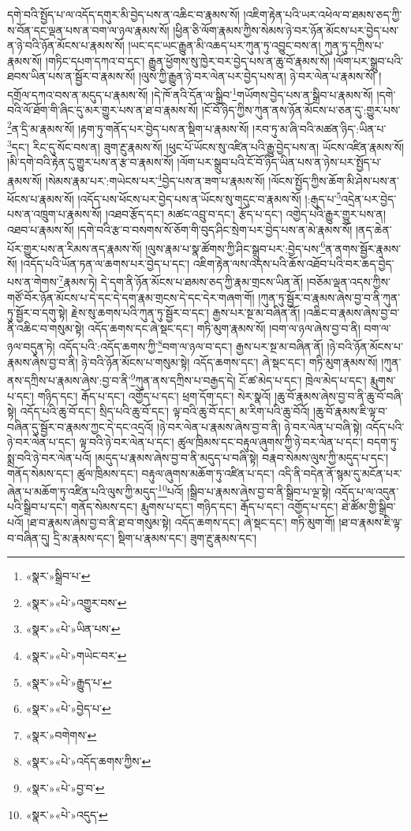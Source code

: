 དགེ་བའི་སྤྱོད་པ་ལ་འདོད་དགུར་མི་བྱེད་པས་ན་འཆིང་བ་རྣམས་སོ། །འཇིག་རྟེན་པའི་ཡར་འཕེལ་བ་ཐམས་ཅད་ཀྱི་ས་བོན་དང་ལྡན་པས་ན་བག་ལ་ཉལ་རྣམས་སོ། །ཕྱིན་ཅི་ལོག་རྣམས་ཀྱིས་སེམས་ཉེ་བར་ཉོན་མོངས་པར་བྱེད་པས་ན་ཉེ་བའི་ཉོན་མོངས་པ་རྣམས་སོ། །ཡང་དང་ཡང་རྒྱུན་མི་འཆད་པར་ཀུན་ཏུ་འབྱུང་བས་ན། ཀུན་ཏུ་དཀྲིས་པ་རྣམས་སོ། །གཏིང་དཔག་དཀའ་བ་དང་། རྒྱུན་ཕྱོགས་སུ་ཁྱེར་བར་བྱེད་པས་ན་ཆུ་བོ་རྣམས་སོ། །ལོག་པར་སྒྲུབ་པའི་ཐབས་ཡིན་པས་ན་སྦྱོར་བ་རྣམས་སོ། །ལུས་ཀྱི་རྒྱུན་ཉེ་བར་ལེན་པར་བྱེད་པས་ན། ཉེ་བར་ལེན་པ་རྣམས་སོ། །དགྲོལ་དཀའ་བས་ན་མདུད་པ་རྣམས་སོ། །དེ་ཁོ་ནའི་དོན་ལ་སྒྲིབ་\footnote{«སྣར་»སྒྲིབ་པ་}གཡོགས་བྱེད་པས་ན་སྒྲིབ་པ་རྣམས་སོ། །དགེ་བའི་ལོ་ཐོག་གི་ཞིང་དུ་མར་གྱུར་པས་ན་ཐ་བ་རྣམས་སོ། །ངོ་བོ་ཉིད་ཀྱིས་ཀུན་ནས་ཉོན་མོངས་པ་ཅན་དུ་:གྱུར་པས་\footnote{«སྣར་»«པེ་»འགྱུར་བས་}ན་དྲི་མ་རྣམས་སོ། །རྟག་ཏུ་གནོད་པར་བྱེད་པས་ན་སྡིག་པ་རྣམས་སོ། །རབ་ཏུ་མ་ཞི་བའི་མཚན་ཉིད་:ཡིན་པ་\footnote{«སྣར་»«པེ་»ཡིན་པས་}དང་། རིང་དུ་སོང་བས་ན། ཟུག་རྔུ་རྣམས་སོ། །ཕུང་པོ་ཡོངས་སུ་འཛིན་པའི་རྒྱུ་བྱེད་པས་ན། ཡོངས་འཛིན་རྣམས་སོ། །མི་དགེ་བའི་རྟེན་དུ་གྱུར་པས་ན་རྩ་བ་རྣམས་སོ། །ལོག་པར་སྒྲུབ་པའི་ངོ་བོ་ཉིད་ཡིན་པས་ན་ཉེས་པར་སྤྱོད་པ་རྣམས་སོ། །སེམས་རྣམ་པར་:གཡེངས་པར་\footnote{«སྣར་»«པེ་»གཡེང་བར་}བྱེད་པས་ན་ཟག་པ་རྣམས་སོ། །ལོངས་སྤྱོད་ཀྱིས་ཆོག་མི་ཤེས་པས་ན་ཕོངས་པ་རྣམས་སོ། །འདོད་པས་ཕོངས་པར་བྱེད་པས་ན་ཡོངས་སུ་གདུང་བ་རྣམས་སོ། །:རྒུད་པ་\footnote{«སྣར་»«པེ་»རྒྱུད་པ་}འདྲེན་པར་བྱེད་པས་ན་འཁྲུག་པ་རྣམས་སོ། །འཐབ་རྩོད་དང་། མཚང་འབྲུ་བ་དང་། རྩོད་པ་དང་། འགྱེད་པའི་རྒྱུར་གྱུར་པས་ན། འཐབ་པ་རྣམས་སོ། །དགེ་བའི་རྩ་བ་བསགས་སོ་ཅོག་གི་བུད་ཤིང་སྲེག་པར་བྱེད་པས་ན་མེ་རྣམས་སོ། །ནད་ཆེན་པོར་གྱུར་པས་ན་རིམས་ནད་རྣམས་སོ། །ལུས་རྣམ་པ་སྣ་ཚོགས་ཀྱི་ཤིང་སྒྲུབ་པར་:བྱེད་པས་\footnote{«སྣར་»«པེ་»བྱེད་པ་}ན་ནགས་སྦྱོར་རྣམས་སོ། །འདོད་པའི་ཡོན་ཏན་ལ་ཆགས་པར་བྱེད་པ་དང་། འཇིག་རྟེན་ལས་འདས་པའི་ཆོས་འཐོབ་པའི་བར་ཆད་བྱེད་པས་ན་གེགས་\footnote{«སྣར་»བགེགས་}རྣམས་ཏེ། དེ་དག་ནི་ཉོན་མོངས་པ་ཐམས་ཅད་ཀྱི་རྣམ་གྲངས་ཡིན་ནོ། །བཅོམ་ལྡན་འདས་ཀྱིས་གཙོ་བོར་ཉོན་མོངས་པ་དེ་དང་དེ་དག་རྣམ་གྲངས་དེ་དང་དེར་གཞག་གོ། །ཀུན་ཏུ་སྦྱོར་བ་རྣམས་ཞེས་བྱ་བ་ནི་ཀུན་ཏུ་སྦྱོར་བ་དགུ་སྟེ། རྗེས་སུ་ཆགས་པའི་ཀུན་ཏུ་སྦྱོར་བ་དང་། རྒྱས་པར་སྔ་མ་བཞིན་ནོ། །འཆིང་བ་རྣམས་ཞེས་བྱ་བ་ནི་འཆིང་བ་གསུམ་སྟེ། འདོད་ཆགས་དང་ཞེ་སྡང་དང་། གཏི་མུག་རྣམས་སོ། །བག་ལ་ཉལ་ཞེས་བྱ་བ་ནི། བག་ལ་ཉལ་བདུན་ཏེ། འདོད་པའི་:འདོད་ཆགས་ཀྱི་\footnote{«སྣར་»«པེ་»འདོད་ཆགས་ཀྱིས་}བག་ལ་ཉལ་བ་དང་། རྒྱས་པར་སྔ་མ་བཞིན་ནོ། །ཉེ་བའི་ཉོན་མོངས་པ་རྣམས་ཞེས་བྱ་བ་ནི། ཉེ་བའི་ཉོན་མོངས་པ་གསུམ་སྟེ། འདོད་ཆགས་དང་། ཞེ་སྡང་དང་། གཏི་མུག་རྣམས་སོ། །ཀུན་ནས་དཀྲིས་པ་རྣམས་ཞེས་:བྱ་བ་ནི་\footnote{«སྣར་»«པེ་»བྱ་བ་}ཀུན་ནས་དཀྲིས་པ་བརྒྱད་དེ། ངོ་ཚ་མེད་པ་དང་། ཁྲེལ་མེད་པ་དང་། རྨུགས་པ་དང་། གཉིད་དང་། རྒོད་པ་དང་། འགྱོད་པ་དང་། ཕྲག་དོག་དང་། སེར་སྣའོ། །ཆུ་བོ་རྣམས་ཞེས་བྱ་བ་ནི་ཆུ་བོ་བཞི་སྟེ། འདོད་པའི་ཆུ་བོ་དང་། སྲིད་པའི་ཆུ་བོ་དང་། ལྟ་བའི་ཆུ་བོ་དང་། མ་རིག་པའི་ཆུ་བོའོ། །ཆུ་བོ་རྣམས་ཇི་ལྟ་བ་བཞིན་དུ་སྦྱོར་བ་རྣམས་ཀྱང་དེ་དང་འདྲའོ། །ཉེ་བར་ལེན་པ་རྣམས་ཞེས་བྱ་བ་ནི། ཉེ་བར་ལེན་པ་བཞི་སྟེ། འདོད་པའི་ཉེ་བར་ལེན་པ་དང་། ལྟ་བའི་ཉེ་བར་ལེན་པ་དང་། ཚུལ་ཁྲིམས་དང་བརྟུལ་ཞུགས་ཀྱི་ཉེ་བར་ལེན་པ་དང་། བདག་ཏུ་སྨྲ་བའི་ཉེ་བར་ལེན་པའོ། །མདུད་པ་རྣམས་ཞེས་བྱ་བ་ནི་མདུད་པ་བཞི་སྟེ། བརྣབ་སེམས་ལུས་ཀྱི་མདུད་པ་དང་། གནོད་སེམས་དང་། ཚུལ་ཁྲིམས་དང་། བརྟུལ་ཞུགས་མཆོག་ཏུ་འཛིན་པ་དང་། འདི་ནི་བདེན་ནོ་སྙམ་དུ་མངོན་པར་ཞེན་པ་མཆོག་ཏུ་འཛིན་པའི་ལུས་ཀྱི་མདུད་\footnote{«སྣར་»«པེ་»འདུད་}པའོ། །སྒྲིབ་པ་རྣམས་ཞེས་བྱ་བ་ནི་སྒྲིབ་པ་ལྔ་སྟེ། འདོད་པ་ལ་འདུན་པའི་སྒྲིབ་པ་དང་། གནོད་སེམས་དང་། རྨུགས་པ་དང་། གཉིད་དང་། རྒོད་པ་དང་། འགྱོད་པ་དང་། ཐེ་ཚོམ་གྱི་སྒྲིབ་པའོ། །ཐ་བ་རྣམས་ཞེས་བྱ་བ་ནི་ཐ་བ་གསུམ་སྟེ། འདོད་ཆགས་དང་། ཞེ་སྡང་དང་། གཏི་མུག་གོ། །ཐ་བ་རྣམས་ཇི་ལྟ་བ་བཞིན་དུ། དྲི་མ་རྣམས་དང་། སྡིག་པ་རྣམས་དང་། ཟུག་རྔུ་རྣམས་དང་། 